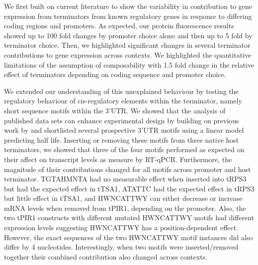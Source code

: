 \documentclass[../main.tex]{subfiles}
\begin{document}
We first built on current literature to show the variability in contribution to gene expression from terminators from known regulatory genes in response to differing coding regions and promoters. 
As expected, our protein fluorescence results showed up to 100 fold changes by promoter choice alone and then up to 5 fold by terminator choice.
Then, we highlighted significant changes in several terminator contributions to gene expression across contexts. 
We highlighted the quantitative limitations of the assumption of composability with 1.5 fold change in the relative effect of terminators depending on coding sequence and promoter choice.

We extended our understanding of this unexplained behaviour by testing the regulatory behaviour of cis-regulatory elements within the terminator, namely short sequence motifs within the 3'UTR.
We showed that the analysis of published data sets can enhance experimental design by building on previous work by \cite{Cheng2017} and shortlisted several prospective 3'UTR motifs using a linear model predicting half life.
Inserting or removing these motifs from three native host terminators, we showed that three of the four motifs performed as expected on their affect on transcript levels as measure by  RT-qPCR.
Furthermore, the magnitude of their contributions changed for all motifs across promoter and host terminator. 
TGTAHMNTA had no measurable effect when inserted into tRPS3 but had the expected effect in tTSA1, ATATTC had the expected effect in tRPS3 but little effect in tTSA1, and HWNCATTWY can either decrease or increase mRNA levels when removed from tPIR1, depending on the promoter.
Also, the two tPIR1 constructs with different mutated HWNCATTWY motifs had different expression levels suggesting HWNCATTWY has a position-dependent effect. 
However, the exact sequences of the two HWNCATTWY motif instances did also differ by 4 nucleotides.
Interestingly, when two motifs were inserted/removed together their combined contribution also changed across contexts.
\end{document}
